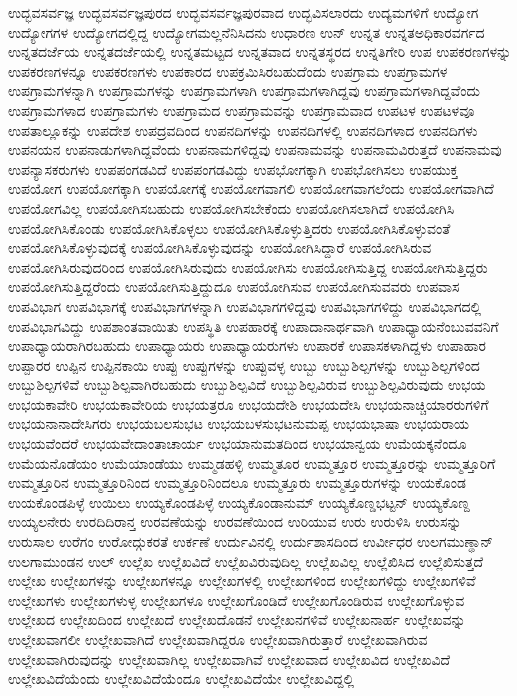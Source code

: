 {ಉದ್ಭವಸರ್ವಜ್ಞ
ಉದ್ಭವಸರ್ವಜ್ಞಪುರದ
ಉದ್ಭವಸರ್ವಜ್ಞಪುರವಾದ
ಉದ್ಭವಿಸಲಾರದು
ಉದ್ಯಮಗಳಿಗೆ
ಉದ್ಯೋಗ
ಉದ್ಯೋಗಗಳ
ಉದ್ಯೋಗದಲ್ಲಿದ್ದ
ಉದ್ಯೋಗಮಲ್ಲನೆನಿಸಿದನು
ಉಧಾರಣ
ಉನ್
ಉನ್ನತ
ಉನ್ನತಅಧಿಕಾರವರ್ಗದ
ಉನ್ನತದರ್ಜೆಯ
ಉನ್ನತದರ್ಜೆಯಲ್ಲಿ
ಉನ್ನತಮಟ್ಟದ
ಉನ್ನತವಾದ
ಉನ್ನತಸ್ಥರದ
ಉನ್ನತಿಗೇರಿ
ಉಪ
ಉಪಕರಣಗಳನ್ನು
ಉಪಕರಣಗಳನ್ನೂ
ಉಪಕರಣಗಳು
ಉಪಕಾರದ
ಉಪಕ್ರಮಿಸಿರಬಹುದೆಂದು
ಉಪಗ್ರಾಮ
ಉಪಗ್ರಾಮಗಳ
ಉಪಗ್ರಾಮಗಳನ್ನಾಗಿ
ಉಪಗ್ರಾಮಗಳನ್ನು
ಉಪಗ್ರಾಮಗಳಾಗಿ
ಉಪಗ್ರಾಮಗಳಾಗಿದ್ದವು
ಉಪಗ್ರಾಮಗಳಾಗಿದ್ದವೆಂದು
ಉಪಗ್ರಾಮಗಳಾದ
ಉಪಗ್ರಾಮಗಳು
ಉಪಗ್ರಾಮದ
ಉಪಗ್ರಾಮವನ್ನು
ಉಪಗ್ರಾಮವಾದ
ಉಪಟಳ
ಉಪಟಳವೂ
ಉಪತಾಲ್ಲೂಕನ್ನು
ಉಪದೇಶ
ಉಪದ್ರವದಿಂದ
ಉಪನದಿಗಳನ್ನು
ಉಪನದಿಗಳಲ್ಲಿ
ಉಪನದಿಗಳಾದ
ಉಪನದಿಗಳು
ಉಪನಯನ
ಉಪನಾಡುಗಳಾಗಿದ್ದವೆಂದು
ಉಪನಾಮಗಳಿದ್ದವು
ಉಪನಾಮವನ್ನು
ಉಪನಾಮವಿರುತ್ತದೆ
ಉಪನಾಮವು
ಉಪನ್ಯಾಸಕರುಗಳು
ಉಪಪಂಗಡವಿದೆ
ಉಪಪಂಗಡವಿದ್ದು
ಉಪಭೋಗಕ್ಕಾಗಿ
ಉಪಭೋಗಿಸಲು
ಉಪಯುಕ್ತ
ಉಪಯೋಗ
ಉಪಯೋಗಕ್ಕಾಗಿ
ಉಪಯೋಗಕ್ಕೆ
ಉಪಯೋಗವಾಗಲಿ
ಉಪಯೋಗವಾಗಲೆಂದು
ಉಪಯೋಗವಾಗಿದೆ
ಉಪಯೋಗವಿಲ್ಲ
ಉಪಯೋಗಿಸಬಹುದು
ಉಪಯೋಗಿಸಬೇಕೆಂದು
ಉಪಯೋಗಿಸಲಾಗಿದೆ
ಉಪಯೋಗಿಸಿ
ಉಪಯೋಗಿಸಿಕೊಂಡು
ಉಪಯೋಗಿಸಿಕೊಳ್ಳಲು
ಉಪಯೋಗಿಸಿಕೊಳ್ಳುತ್ತಿದರು
ಉಪಯೋಗಿಸಿಕೊಳ್ಳುವಂತೆ
ಉಪಯೋಗಿಸಿಕೊಳ್ಳುವುದಕ್ಕೆ
ಉಪಯೋಗಿಸಿಕೊಳ್ಳುವುದನ್ನು
ಉಪಯೋಗಿಸಿದ್ದಾರೆ
ಉಪಯೋಗಿಸಿರುವ
ಉಪಯೋಗಿಸಿರುವುದರಿಂದ
ಉಪಯೋಗಿಸಿರುವುದು
ಉಪಯೋಗಿಸು
ಉಪಯೋಗಿಸುತ್ತಿದ್ದ
ಉಪಯೋಗಿಸುತ್ತಿದ್ದರು
ಉಪಯೋಗಿಸುತ್ತಿದ್ದರೆಂದು
ಉಪಯೋಗಿಸುತ್ತಿದ್ದುದೂ
ಉಪಯೋಗಿಸುವ
ಉಪಯೋಗಿಸುವವರು
ಉಪವಾಸ
ಉಪವಿಭಾಗ
ಉಪವಿಭಾಗಕ್ಕೆ
ಉಪವಿಭಾಗಗಳನ್ನಾಗಿ
ಉಪವಿಭಾಗಗಳಿದ್ದವು
ಉಪವಿಭಾಗಗಳಿದ್ದು
ಉಪವಿಭಾಗದಲ್ಲಿ
ಉಪವಿಭಾಗವಿದ್ದು
ಉಪಶಾಂತವಾಯಿತು
ಉಪಸ್ಥಿತಿ
ಉಪಹಾರಕ್ಕೆ
ಉಪಾದಾನಾರ್ಥವಾಗಿ
ಉಪಾಧ್ಯಾಯನೆಂಬುವವನಿಗೆ
ಉಪಾಧ್ಯಾಯರಾಗಿರಬಹುದು
ಉಪಾಧ್ಯಾಯರು
ಉಪಾಧ್ಯಾಯರುಗಳು
ಉಪಾರಕೆ
ಉಪಾಸಕಳಾಗಿದ್ದಳು
ಉಪಾಹಾರ
ಉಪ್ಪಾರರ
ಉಪ್ಪಿನ
ಉಪ್ಪಿನಕಾಯಿ
ಉಪ್ಪು
ಉಪ್ಪುಗಳನ್ನು
ಉಪ್ಪುವಳ್ಳ
ಉಬ್ಬು
ಉಬ್ಬುಶಿಲ್ಪಗಳನ್ನು
ಉಬ್ಬುಶಿಲ್ಪಗಳಿಂದ
ಉಬ್ಬುಶಿಲ್ಪಗಳಿವೆ
ಉಬ್ಬುಶಿಲ್ಪವಾಗಿರಬಹುದು
ಉಬ್ಬುಶಿಲ್ಪವಿದೆ
ಉಬ್ಬುಶಿಲ್ಪವಿರುವ
ಉಬ್ಬುಶಿಲ್ಪವಿರುವುದು
ಉಭಯ
ಉಭಯಕಾವೇರಿ
ಉಭಯಕಾವೇರಿಯ
ಉಭಯತ್ರರೂ
ಉಭಯದೇಶಿ
ಉಭಯದೇಸಿ
ಉಭಯನಾಚ್ಚಿಯಾರರುಗಳಿಗೆ
ಉಭಯನಾನಾದೇಸಿಗರು
ಉಭಯಬಲಸುಭಟ
ಉಭಯಬಳಸುಭಟನುಮಪ್ಪ
ಉಭಯಭಾಷಾ
ಉಭಯರಾಯ
ಉಭಯವೆಂದರೆ
ಉಭಯವೇದಾಂತಾಚಾರ್ಯ
ಉಭಯಾನುಮತದಿಂದ
ಉಭಯಾನ್ವಯ
ಉಮೆಯಕ್ಕನೆಂದೂ
ಉಮೆಯನೊಡೆಯಂ
ಉಮೆಯಾಂಡೆಯು
ಉಮ್ಮಡಹಳ್ಳಿ
ಉಮ್ಮತೂರ
ಉಮ್ಮತ್ತೂರ
ಉಮ್ಮತ್ತೂರನ್ನು
ಉಮ್ಮತ್ತೂರಿಗೆ
ಉಮ್ಮತ್ತೂರಿನ
ಉಮ್ಮತ್ತೂರಿನಿಂದ
ಉಮ್ಮತ್ತೂರಿನಿಂದಲೂ
ಉಮ್ಮತ್ತೂರು
ಉಮ್ಮತ್ತೂರುಗಳನ್ನು
ಉಯಕೊಂಡ
ಉಯಕೊಂಡಪಿಳ್ಳೆ
ಉಯಿಲು
ಉಯ್ಯಕೊಂಡಪಿಳ್ಳೆ
ಉಯ್ಯಕೊಂಡಾನುಮ್
ಉಯ್ಯಕೊಣ್ಡಭಟ್ಟನ್
ಉಯ್ಯಕೊಣ್ದ
ಉಯ್ಯಲನೇರು
ಉರದಿದಿರಾನ್ತ
ಉರವಣೆಯನ್ನು
ಉರವಣೆಯಿಂದ
ಉರಿಯುವ
ಉರು
ಉರುಳಿಸಿ
ಉರುಸನ್ನು
ಉರುಸಾಲ
ಉರೆಗಂ
ಉರೋದ್ಗುಕರತೆ
ಉರ್ಕಣೆ
ಉರ್ದುವಿನಲ್ಲಿ
ಉರ್ದುಶಾಸದಿಂದ
ಉರ್ವೀಧರ
ಉಲಗಮುಣ್ಢಾನ್
ಉಲಗಾಮುಂಡನ
ಉಲ್
ಉಲ್ಲೆಖ
ಉಲ್ಲೆಖವಿದೆ
ಉಲ್ಲೆಖವಿರುವುದಿಲ್ಲ
ಉಲ್ಲೆಖವಿಲ್ಲ
ಉಲ್ಲೆಖಿಸಿದ
ಉಲ್ಲೆಖಿಸುತ್ತದೆ
ಉಲ್ಲೇಖ
ಉಲ್ಲೇಖಗಳನ್ನು
ಉಲ್ಲೇಖಗಳನ್ನೂ
ಉಲ್ಲೇಖಗಳಲ್ಲಿ
ಉಲ್ಲೇಖಗಳಿಂದ
ಉಲ್ಲೇಖಗಳಿದ್ದು
ಉಲ್ಲೇಖಗಳಿವೆ
ಉಲ್ಲೇಖಗಳು
ಉಲ್ಲೇಖಗಳುಳ್ಳ
ಉಲ್ಲೇಖಗಳೂ
ಉಲ್ಲೇಖಗೊಂಡಿದೆ
ಉಲ್ಲೇಖಗೊಂಡಿರುವ
ಉಲ್ಲೇಖಗೊಳ್ಳುವ
ಉಲ್ಲೇಖದ
ಉಲ್ಲೇಖದಿಂದ
ಉಲ್ಲೇಖದೆ
ಉಲ್ಲೇಖದೊಡನೆ
ಉಲ್ಲೇಖನಗಳಿವೆ
ಉಲ್ಲೇಖನಾರ್ಹ
ಉಲ್ಲೇಖವನ್ನು
ಉಲ್ಲೇಖವಾಗಲೀ
ಉಲ್ಲೇಖವಾಗಿದೆ
ಉಲ್ಲೇಖವಾಗಿದ್ದರೂ
ಉಲ್ಲೇಖವಾಗಿರುತ್ತಾರೆ
ಉಲ್ಲೇಖವಾಗಿರುವ
ಉಲ್ಲೇಖವಾಗಿರುವುದನ್ನು
ಉಲ್ಲೇಖವಾಗಿಲ್ಲ
ಉಲ್ಲೇಖವಾಗಿವೆ
ಉಲ್ಲೇಖವಾದ
ಉಲ್ಲೇಖವಿದ
ಉಲ್ಲೇಖವಿದೆ
ಉಲ್ಲೇಖವಿದೆಯೆಂದು
ಉಲ್ಲೇಖವಿದೆಯೆಂದೂ
ಉಲ್ಲೇಖವಿದೆಯೇ
ಉಲ್ಲೇಖವಿದ್ದಲ್ಲಿ
}
